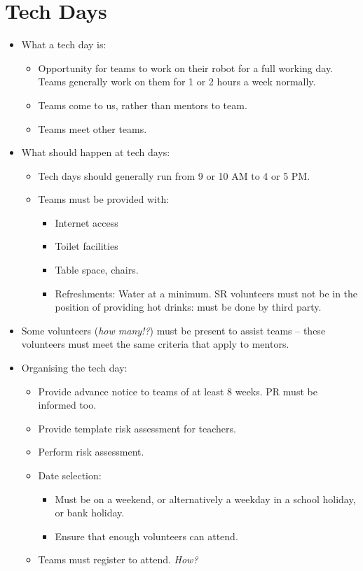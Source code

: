 \chapter{Tech Days}

\begin{itemize}
\item What a tech day is:
  \begin{itemize}
  \item Opportunity for teams to work on their robot for a full working day.  Teams generally work on them for 1 or 2 hours a week normally.
  \item Teams come to us, rather than mentors to team.
  \item Teams meet other teams.
  \end{itemize}


\item What should happen at tech days:
  \begin{itemize}
  \item Tech days should generally run from 9 or 10 AM to 4 or 5 PM.
  \item Teams must be provided with:
    \begin{itemize}
    \item Internet access
    \item Toilet facilities
    \item Table space, chairs.
    \item Refreshments: Water at a minimum.  SR volunteers must not be in the position of providing hot drinks: must be done by third party.
    \end{itemize}
  \end{itemize}

\item Some volunteers (\textit{how many!?}) must be present to assist teams -- these volunteers must meet the same criteria that apply to mentors.

\item  Organising the tech day:
  \begin{itemize}
  \item Provide advance notice to teams of at least 8 weeks.  PR must be informed too.
  \item Provide template risk assessment for teachers.
  \item Perform risk assessment.
  \item Date selection:
    \begin{itemize}
    \item Must be on a weekend, or alternatively a weekday in a school holiday, or bank holiday.
    \item Ensure that enough volunteers can attend.
    \end{itemize}
  \item Teams must register to attend.  \textit{How?}
  \end{itemize}

\end{itemize}
